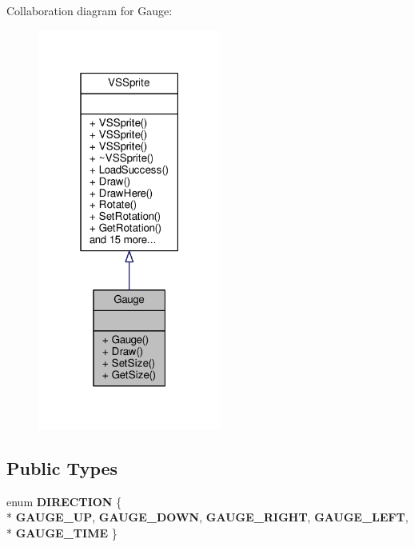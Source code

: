 Collaboration diagram for Gauge\+:
\nopagebreak
\begin{figure}[H]
\begin{center}
\leavevmode
\includegraphics[width=171pt]{dc/d75/classGauge__coll__graph}
\end{center}
\end{figure}
\subsection*{Public Types}
\begin{DoxyCompactItemize}
\item 
enum {\bfseries D\+I\+R\+E\+C\+T\+I\+ON} \{ \\*
{\bfseries G\+A\+U\+G\+E\+\_\+\+UP}, 
{\bfseries G\+A\+U\+G\+E\+\_\+\+D\+O\+WN}, 
{\bfseries G\+A\+U\+G\+E\+\_\+\+R\+I\+G\+HT}, 
{\bfseries G\+A\+U\+G\+E\+\_\+\+L\+E\+FT}, 
\\*
{\bfseries G\+A\+U\+G\+E\+\_\+\+T\+I\+ME}
 \}\hypertarget{classGauge_a3d63ecb78dd157371874e9b602ad0e57}{}\label{classGauge_a3d63ecb78dd157371874e9b602ad0e57}

\end{DoxyCompactItemize}
